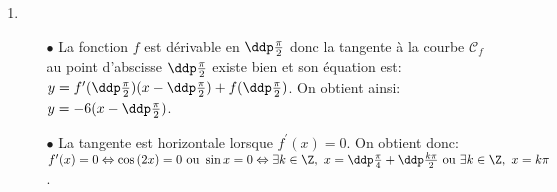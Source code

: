 \begin{correction}
\begin{enumerate}
\begin{center}
\end{center}
\item 
\begin{itemize}
\item[$\bullet$] La fonction $f$ est d\'erivable en $\ddp\frac{\pi}{2}$ donc la tangente \`{a} la courbe $\mathcal{C}_f$ au point d'abscisse $\ddp\frac{\pi}{2}$ existe bien et son \'equation est: $y=f^{\prime}(\ddp\frac{\pi}{2}) (x-\ddp\frac{\pi}{2})+f(\ddp\frac{\pi}{2})$. On obtient ainsi: $y=-6(x-\ddp\frac{\pi}{2})$.
\item[$\bullet$] La tangente est horizontale lorsque $f^{\prime}(x)=0$. On obtient donc: $f^{\prime}(x)=0\Leftrightarrow \cos{(2x)}=0\ \hbox{ou}\ \sin{x}=0\Leftrightarrow \exists k\in\Z,\ x=\ddp\frac{\pi}{4}+\ddp\frac{k\pi}{2}\ \hbox{ou}\ \exists k\in\Z,\ x=k\pi$.
\end{itemize}
\end{enumerate}
\end{correction}



